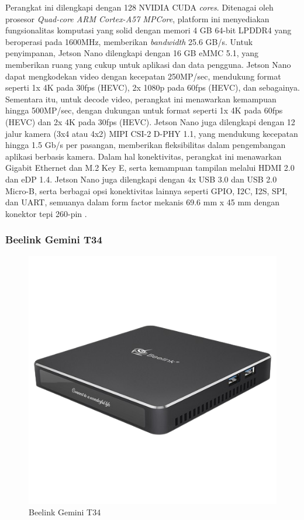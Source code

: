 Perangkat ini dilengkapi dengan 128 NVIDIA CUDA \emph{cores}. Ditenagai oleh prosesor \emph{Quad-core ARM Cortex-A57 MPCore}, platform ini menyediakan fungsionalitas komputasi yang solid dengan memori 4 GB 64-bit LPDDR4 yang beroperasi pada 1600MHz, memberikan \emph{bandwidth} 25.6 GB/s. Untuk penyimpanan, Jetson Nano dilengkapi dengan 16 GB eMMC 5.1, yang memberikan ruang yang cukup untuk aplikasi dan data pengguna. Jetson Nano dapat mengkodekan video dengan kecepatan 250MP/sec, mendukung format seperti 1x 4K pada 30fps (HEVC), 2x 1080p pada 60fps (HEVC), dan sebagainya. Sementara itu, untuk decode video, perangkat ini menawarkan kemampuan hingga 500MP/sec, dengan dukungan untuk format seperti 1x 4K pada 60fps (HEVC) dan 2x 4K pada 30fps (HEVC). Jetson Nano juga dilengkapi dengan 12 jalur kamera (3x4 atau 4x2) MIPI CSI-2 D-PHY 1.1, yang mendukung kecepatan hingga 1.5 Gb/s per pasangan, memberikan fleksibilitas dalam pengembangan aplikasi berbasis kamera. Dalam hal konektivitas, perangkat ini menawarkan Gigabit Ethernet dan M.2 Key E, serta kemampuan tampilan melalui HDMI 2.0 dan eDP 1.4. Jetson Nano juga dilengkapi dengan 4x USB 3.0 dan USB 2.0 Micro-B, serta berbagai opsi konektivitas lainnya seperti GPIO, I2C, I2S, SPI, dan UART, semuanya dalam form factor mekanis 69.6 mm x 45 mm dengan konektor tepi 260-pin \parencite{nvidiaJetsonNano}.

\subsubsection{Beelink Gemini T34}
 \begin{figure}[H]
     \centering

     \includegraphics[scale=0.4]{gambar/bab2-beelink-gemini-t34.png}
 
     \caption{Beelink Gemini T34}
     \label{fig:beelinkgeminit34}
\end{figure}


